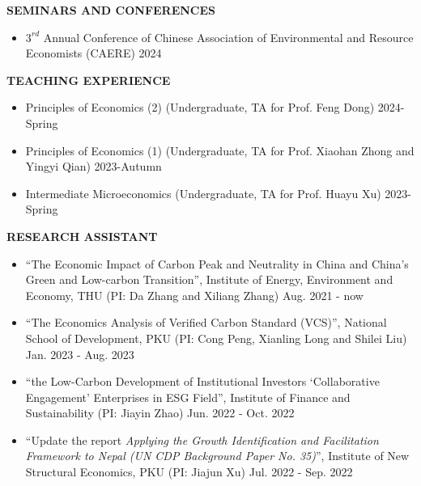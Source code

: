 \documentclass[UTF8]{ctexbook}
\begin{document}
\vspace{12pt}


\begin{center}
    \textbf{SEMINARS AND CONFERENCES}
\end{center}

\begin{itemize}
    \item $3^{rd}$ Annual Conference of Chinese Association of Environmental and Resource Economists (CAERE) \hfill 2024
\end{itemize}


\vspace{12pt}

\begin{center}
    \textbf{TEACHING EXPERIENCE}
\end{center}


\begin{itemize}
    \item Principles of Economics (2) (Undergraduate, TA for Prof. Feng Dong) \hfill 2024-Spring
    \item Principles of Economics (1) (Undergraduate, TA for Prof. Xiaohan Zhong and Yingyi Qian) \hfill 2023-Autumn
    \item Intermediate Microeconomics (Undergraduate, TA for Prof. Huayu Xu) \hfill 2023-Spring
\end{itemize}

\vspace{12pt}

\begin{center}
    \textbf{RESEARCH ASSISTANT}
\end{center}


\begin{itemize}
    \item ``The Economic Impact of Carbon Peak and Neutrality in China and China's Green and Low-carbon Transition'', Institute of Energy, Environment and Economy, THU (PI: Da Zhang and Xiliang Zhang) \hfill Aug. 2021 - now
    \item ``The Economics Analysis of Verified Carbon Standard (VCS)'', National School of Development, PKU (PI: Cong Peng, Xianling Long and Shilei Liu) \hfill Jan. 2023 - Aug. 2023
    \item ``the Low-Carbon Development of Institutional Investors `Collaborative Engagement' Enterprises in ESG Field'', Institute of Finance and Sustainability (PI: Jiayin Zhao) \hfill Jun. 2022 - Oct. 2022
    \item ``Update the report \textit{Applying the Growth Identification and Facilitation Framework to Nepal (UN CDP Background Paper No. 35)}'', Institute of New Structural Economics, PKU (PI: Jiajun Xu) \hfill Jul. 2022 - Sep. 2022
\end{itemize}
\end{document}
